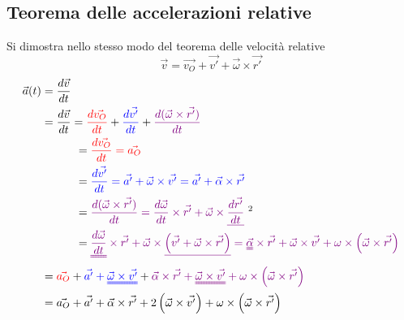 \documentclass[twoside]{article}
\begin{document}
\subsection{Teorema delle accelerazioni relative}
Si dimostra nello stesso modo del teorema delle velocità relative
\begin{equation*}
  \vec{v} = \vec{v_O} + \vec{v'}  + \vec{\omega } \times \vec{r'}
\end{equation*}
\begin{align*}
  \vec{a}(t) & = \frac{d \vec{v}}{dt}                                                                                                                                                                                                                                                                                                \\
             & = \frac{d \vec{v}}{dt} = \textcolor{red}{\frac{d \vec{v_O}}{dt}} + \textcolor{blue}{\frac{d \vec{v'}}{dt}} + \textcolor{violet}{\frac{d (\vec{\omega} \times \vec{r'})}{dt}}                                                                                                                                          \\
             & \quad \quad \quad = \textcolor{red}{\frac{d \vec{v_O}}{dt} = \vec{a_O}}                                                                                                                                                                                                                                               \\
             & \quad \quad \quad = \textcolor{blue}{\frac{d \vec{v'}}{dt} = \vec{a'} + \vec{\omega} \times \vec{v'} = \vec{a'} + \vec{\alpha} \times \vec{r'}}                                                                                                                                                                       \\
             & \quad \quad \quad = \textcolor{violet}{\frac{d (\vec{\omega} \times \vec{r'})}{dt} = \frac{d\vec{\omega}}{dt} \times \vec{r'} + \vec{\omega} \times \underline{\frac{d\vec{r'}}{dt}}} \ \text{\footnotemark[2]}                                                                                                       \\
             & \quad \quad \quad = \textcolor{violet}{ \uuline{\frac{d\vec{\omega}}{dt}} \times \vec{r'} + \vec{\omega} \times \underline{\left( \vec{v'} + \vec{\omega} \times \vec{r'} \right)} = \uuline{\vec{\alpha}} \times \vec{r'} + \vec{\omega} \times \vec{v'} + \omega \times \left(\vec{\omega} \times \vec{r'} \right)} \\
             & = \textcolor{red}{\vec{a_O}}  + \textcolor{blue}{\vec{a'} + \uuline{\vec{\omega} \times \vec{v'}}} + \textcolor{violet}{\vec{\alpha} \times \vec{r'} + \uuline{\vec{\omega} \times \vec{v'}} + \omega \times \left(\vec{\omega} \times \vec{r'} \right) }                                                             \\
             & = \vec{a_O} +\vec{a'} + \vec{\alpha} \times \vec{r'} + 2\left(\vec{\omega} \times \vec{v'}\right) + \omega \times \left(\vec{\omega} \times \vec{r'} \right)
\end{align*}
\end{document}
